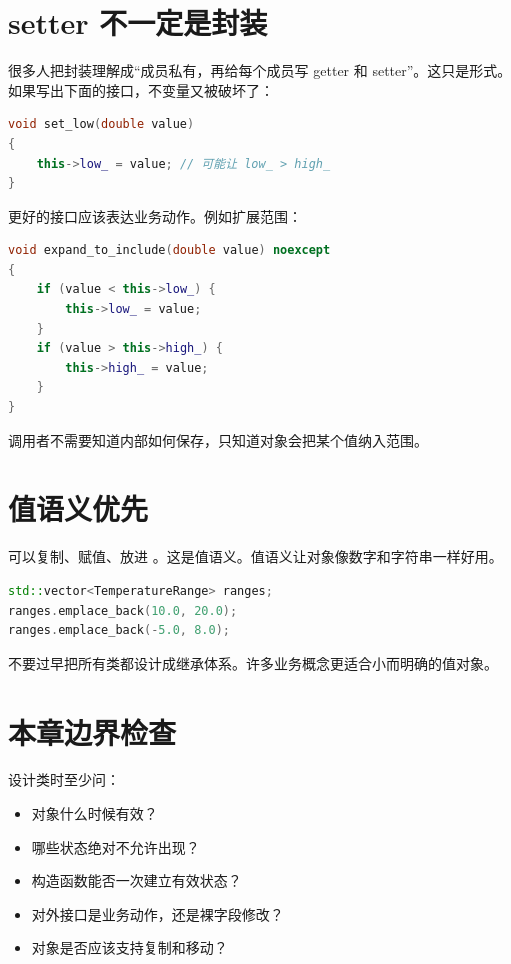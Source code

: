 \section{setter 不一定是封装}

很多人把封装理解成“成员私有，再给每个成员写 getter 和 setter”。这只是形式。如果写出下面的接口，不变量又被破坏了：

\begin{lstlisting}[language=C++,caption={危险的 setter}]
void set_low(double value)
{
    this->low_ = value; // 可能让 low_ > high_
}
\end{lstlisting}

更好的接口应该表达业务动作。例如扩展范围：

\begin{lstlisting}[language=C++,caption={用业务动作维护不变量}]
void expand_to_include(double value) noexcept
{
    if (value < this->low_) {
        this->low_ = value;
    }
    if (value > this->high_) {
        this->high_ = value;
    }
}
\end{lstlisting}

调用者不需要知道内部如何保存，只知道对象会把某个值纳入范围。

\section{值语义优先}

 可以复制、赋值、放进 。这是值语义。值语义让对象像数字和字符串一样好用。

\begin{lstlisting}[language=C++,caption={值语义让对象易组合}]
std::vector<TemperatureRange> ranges;
ranges.emplace_back(10.0, 20.0);
ranges.emplace_back(-5.0, 8.0);
\end{lstlisting}

不要过早把所有类都设计成继承体系。许多业务概念更适合小而明确的值对象。

\section{本章边界检查}

设计类时至少问：

\begin{itemize}
  \item 对象什么时候有效？
  \item 哪些状态绝对不允许出现？
  \item 构造函数能否一次建立有效状态？
  \item 对外接口是业务动作，还是裸字段修改？
  \item 对象是否应该支持复制和移动？
\end{itemize}

